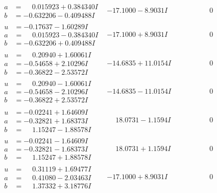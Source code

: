 \documentclass[1p]{elsarticle_modified}
\theoremstyle{definition}
\begin{document}
$$\begin{array}{c|c|c}
\begin{aligned}
a &= \phantom{-}0.015923 + 0.384340 I \\
b &= -0.632206 - 0.409488 I\end{aligned}
 & -17.1000 - 8.9031 I & \phantom{-0.000000 } 0 \\ \hline\begin{aligned}
u &= -0.17637 - 1.60289 I \\
a &= \phantom{-}0.015923 - 0.384340 I \\
b &= -0.632206 + 0.409488 I\end{aligned}
 & -17.1000 + 8.9031 I & \phantom{-0.000000 } 0 \\ \hline\begin{aligned}
u &= \phantom{-}0.20940 + 1.60061 I \\
a &= -0.54658 + 2.10296 I \\
b &= -0.36822 - 2.53572 I\end{aligned}
 & -14.6835 + 11.0154 I & \phantom{-0.000000 } 0 \\ \hline\begin{aligned}
u &= \phantom{-}0.20940 - 1.60061 I \\
a &= -0.54658 - 2.10296 I \\
b &= -0.36822 + 2.53572 I\end{aligned}
 & -14.6835 - 11.0154 I & \phantom{-0.000000 } 0 \\ \hline\begin{aligned}
u &= -0.02241 + 1.64609 I \\
a &= -0.32821 + 1.68373 I \\
b &= \phantom{-}1.15247 - 1.88578 I\end{aligned}
 & \phantom{-}18.0731 - 1.1594 I & \phantom{-0.000000 } 0 \\ \hline\begin{aligned}
u &= -0.02241 - 1.64609 I \\
a &= -0.32821 - 1.68373 I \\
b &= \phantom{-}1.15247 + 1.88578 I\end{aligned}
 & \phantom{-}18.0731 + 1.1594 I & \phantom{-0.000000 } 0 \\ \hline\begin{aligned}
u &= \phantom{-}0.31119 + 1.69477 I \\
a &= \phantom{-}0.41080 - 2.03463 I \\
b &= \phantom{-}1.37332 + 3.18776 I\end{aligned}
 & -17.1000 + 8.9031 I & \phantom{-0.000000 } 0 \\ \hline\begin{aligned}

\end{aligned}
\end{array}$$
\end{document}
